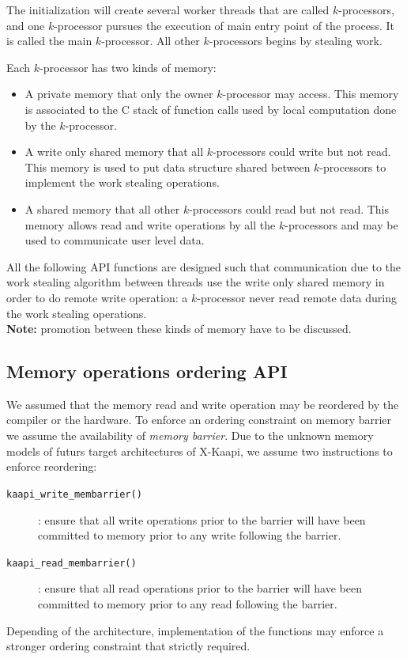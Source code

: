 \documentclass{report}
\newcommand{\kaapi}{\textsc{X}-Kaapi\xspace}
\begin{document}
The initialization will create several worker threads that are called $k$-processors, and one $k$-processor pursues  the execution of main entry point of the process. It is called the main $k$-processor. All other $k$-processors begins by stealing work.

Each $k$-processor has two kinds of memory:
\begin{itemize}
\item A private memory that only the owner $k$-processor may access. This memory is associated to the C stack of function calls used by local computation done by the $k$-processor.
\item A write only shared memory that all $k$-processors could write but not read. This memory is used to put data structure shared between $k$-processors to implement the work stealing operations.
\item A shared memory that all other $k$-processors could read but not read. This memory allows read and write operations by all the $k$-processors and may be used to communicate user level data.
\end{itemize}
All the following API functions are designed such that communication due to the work stealing algorithm between threads use the write only shared memory in order to do remote write operation: a $k$-processor never read remote data during the work stealing operations.\\

\noindent\textbf{Note:} promotion between these kinds of memory have to be discussed.\\

\subsection{Memory operations ordering API}
We assumed that the memory read and write operation may be reordered by the compiler or the hardware. To enforce an ordering constraint on memory barrier we assume the availability of \textit{memory barrier}. Due to the unknown memory models of futurs target architectures of \kaapi, we assume two instructions to enforce reordering:
\begin{description}
\item [\texttt{kaapi\_write\_membarrier()}]: ensure that all  write operations prior to the barrier will have been committed to memory prior to any write following the barrier.
\item [\texttt{kaapi\_read\_membarrier()}]: ensure that all  read operations prior to the barrier will have been committed to memory prior to any read following the barrier.
\end{description}
Depending of the architecture, implementation of the functions may enforce a stronger ordering constraint that strictly required.
\end{document}
